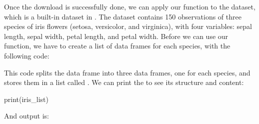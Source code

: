 \documentclass[article]{jss}
\begin{document}
Once the download is successfully done, we can apply our function to the  dataset, which is a built-in dataset in . The  dataset contains 150 observations of three species of iris flowers (setosa, versicolor, and virginica), with four variables: sepal length, sepal width, petal length, and petal width.
Before we can use our function, we have to create a list of data frames for each species, with the following code:
\begin{CodeChunk}
\end{CodeChunk}
This code splits the  data frame into three data frames, one for each species, and stores them in a list called . We can print the  to see its structure and content:
\begin{CodeChunk}
\begin{CodeInput}
print(iris_list)
\end{CodeInput}
\end{CodeChunk}
And output is:
\end{document}
